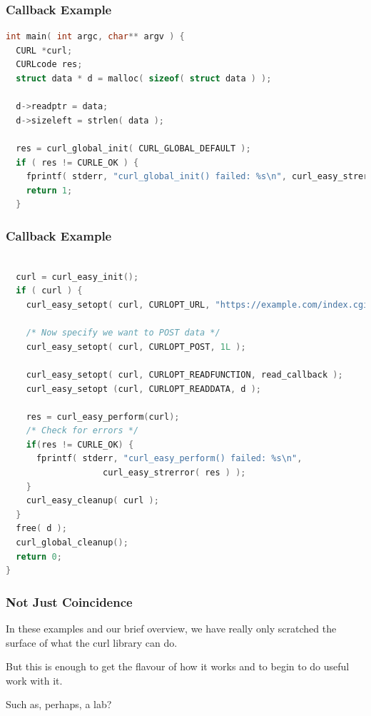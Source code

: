 \begin{frame}[fragile]
\frametitle{Callback Example}
\begin{lstlisting}[language=C]
int main( int argc, char** argv ) {
  CURL *curl;
  CURLcode res;
  struct data * d = malloc( sizeof( struct data ) );
 
  d->readptr = data;
  d->sizeleft = strlen( data );
 
  res = curl_global_init( CURL_GLOBAL_DEFAULT );
  if ( res != CURLE_OK ) {
    fprintf( stderr, "curl_global_init() failed: %s\n", curl_easy_strerror( res ) );
    return 1;
  }
\end{lstlisting}

\end{frame}



\begin{frame}[fragile]
\frametitle{Callback Example}
\begin{lstlisting}[language=C]
 
  curl = curl_easy_init();
  if ( curl ) {
    curl_easy_setopt( curl, CURLOPT_URL, "https://example.com/index.cgi" );
 
    /* Now specify we want to POST data */ 
    curl_easy_setopt( curl, CURLOPT_POST, 1L );
 
    curl_easy_setopt( curl, CURLOPT_READFUNCTION, read_callback );
    curl_easy_setopt (curl, CURLOPT_READDATA, d );
 
    res = curl_easy_perform(curl);
    /* Check for errors */ 
    if(res != CURLE_OK) {
      fprintf( stderr, "curl_easy_perform() failed: %s\n",
                   curl_easy_strerror( res ) );
    }  
    curl_easy_cleanup( curl );
  }
  free( d );
  curl_global_cleanup();
  return 0;
}
\end{lstlisting}

\end{frame}



\begin{frame}
\frametitle{Not Just Coincidence}

In these examples and our brief overview, we have really only scratched the surface of what the curl library can do. 

But this is enough to get the flavour of how it works and to begin to do useful work with it.

Such as, perhaps, a lab?


\end{frame}





